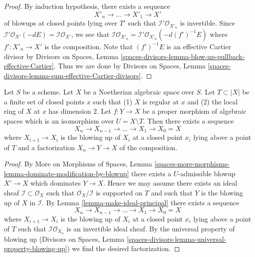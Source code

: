\begin{proof}
\medskip\noindent
By induction hypothesis, there exists a sequence
$$
X'_n \to \ldots \to X'_1 \to X'
$$
of blowups at closed points lying over $T'$ such that
$\mathcal{I}'\mathcal{O}_{X'_n}$ is invertible. Since
$\mathcal{I}'\mathcal{O}_{X'}(-dE) = \mathcal{I}\mathcal{O}_{X'}$, we see
that $\mathcal{I}\mathcal{O}_{X'_n} =
\mathcal{I}'\mathcal{O}_{X'_n}(-d(f')^{-1}E)$
where $f' : X'_n \to X'$ is the composition.
Note that $(f')^{-1}E$ is an effective Cartier divisor by
Divisors on Spaces, Lemma
\ref{spaces-divisors-lemma-blow-up-pullback-effective-Cartier}.
Thus we are done by
Divisors on Spaces, Lemma
\ref{spaces-divisors-lemma-sum-effective-Cartier-divisors}.
\end{proof}

\begin{lemma}
\label{lemma-dominate-by-blowing-up-in-points}
Let $S$ be a scheme. Let $X$ be a Noetherian algebraic space over $S$.
Let $T \subset |X|$ be a finite set of closed points $x$ such that
(1) $X$ is regular at $x$ and (2) the local ring of $X$ at $x$ has
dimension $2$. Let $f : Y \to X$ be a proper morphism of
algebraic spaces which is an isomorphism over $U = X \setminus T$.
Then there exists a sequence
$$
X_n \to X_{n - 1} \to \ldots \to X_1 \to X_0 = X
$$
where $X_{i + 1} \to X_i$ is the blowing up of $X_i$ at a closed
point $x_i$ lying above a point of $T$ and a factorization $X_n \to Y \to X$
of the composition.
\end{lemma}

\begin{proof}
By More on Morphisms of Spaces,
Lemma \ref{spaces-more-morphisms-lemma-dominate-modification-by-blowup} 
there exists a $U$-admissible blowup $X' \to X$ which dominates
$Y \to X$. Hence we may assume there exists an ideal sheaf
$\mathcal{I} \subset \mathcal{O}_X$ such that
$\mathcal{O}_X/\mathcal{I}$ is supported on $T$ and such that
$Y$ is the blowing up of $X$ in $\mathcal{I}$.
By Lemma \ref{lemma-make-ideal-principal} 
there exists a sequence
$$
X_n \to X_{n - 1} \to \ldots \to X_1 \to X_0 = X
$$
where $X_{i + 1} \to X_i$ is the blowing up of $X_i$ at a closed
point $x_i$ lying above a point of $T$ such that
$\mathcal{I}\mathcal{O}_{X_n}$ is an invertible ideal sheaf.
By the universal property of blowing up
(Divisors on Spaces, Lemma
\ref{spaces-divisors-lemma-universal-property-blowing-up})
we find the desired factorization.
\end{proof}






